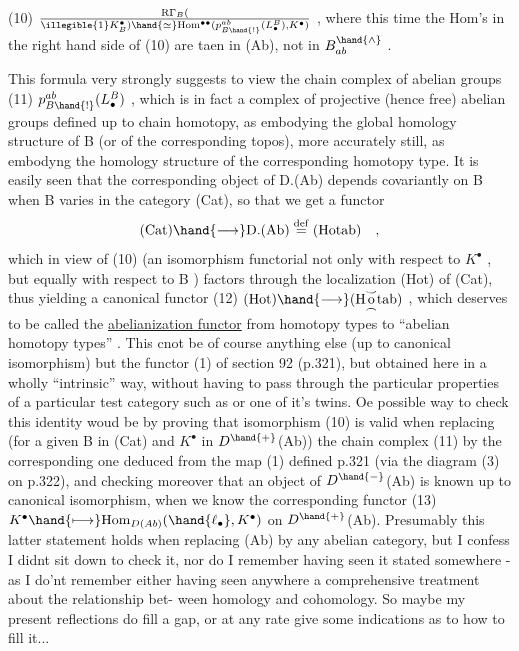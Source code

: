 (10) \qquad $\mathrm{R}\Gamma_B(\over{\illegible{1}}{K}^\bullet_B) \hand{\simeq} \mathrm{Hom}^{\bullet\bullet}(p^{ab}_{B\hand{!}}(L^B_\bullet), K^\bullet)$ \quad ,
where this time the Hom's in the  right hand side of (10) are taen
in (Ab), not in $B^\hand{\wedge}_{ab}$ .

This formula very strongly suggests to view the chain complex of
abelian groups
(11) \qquad $p^{ab}_{B\hand{!}}(L^B_\bullet)$ \quad ,
which is in fact a complex of projective (hence free) abelian groups
defined up to chain homotopy, as embodying the global homology structure
of B (or of the corresponding topos), more accurately still, as embodyng
the homology structure of the corresponding homotopy type. It is easily
seen that the corresponding object of D.(Ab) depends covariantly on B
when B varies in the category (Cat), so that we get a functor
\[ (\mathrm{Cat}) \hand{\longrightarrow} \mathrm{D.(Ab)} \overset{\mathrm{def}}{=} (\mathrm{Hotab}) \quad , \]
which in view of (10) (an isomorphism functorial not only  with respect
to $K^\bullet$ , but equally with respect to B ) factors through the localization
(Hot) of (Cat), thus yielding a canonical functor
(12) \qquad $(\mathrm{Hot}) \hand{\longrightarrow} (\mathrm{H}\overset{\smile}{\underset{\frown}{\mathrm{o}}}\mathrm{tab})$ \quad ,
which deserves to be called the \uline{abelianization functor}\hand{,} from homotopy
types to ``abelian homotopy types'' . This cnot be of course anything else
(up to canonical isomorphism) but the functor (1) of section 92 (p.321),
but obtained here in a wholly ``intrinsic'' way, without having to pass
through the particular properties of a particular test category such as
\hand{$\Delta$} or one of it's twins. Oe possible way to check this identity woud
be by proving that   isomorphism (10) is valid when replacing
(for a given B in (Cat) and $K^\bullet$ in $D^{\hand{+}}$(Ab)) the chain complex (11) by the
corresponding one deduced from the map (1) defined p.321 (via the diagram
(3) on p.322), and checking moreover that an object \inserted{$\ell_\bullet$} of $D^{\hand{-}}$(Ab) is known
up to canonical isomorphism, when we know the corresponding functor
(13) \qquad $K^\bullet \hand{\longmapsto} \mathrm{Hom}_{D(Ab)}(\hand{\ell_\bullet} , K^\bullet)$
on $D^{\hand{+}}$(Ab). Presumably this latter statement holds when replacing  (Ab)
by any abelian category, but I confess I didnt sit down to check it, nor
do I remember having seen it stated somewhere - as I do'nt remember either
having seen anywhere a comprehensive treatment about the relationship bet-%
ween homology and cohomology. So maybe my present reflections do fill a
gap, or at any rate give some indications as to how to fill it...


